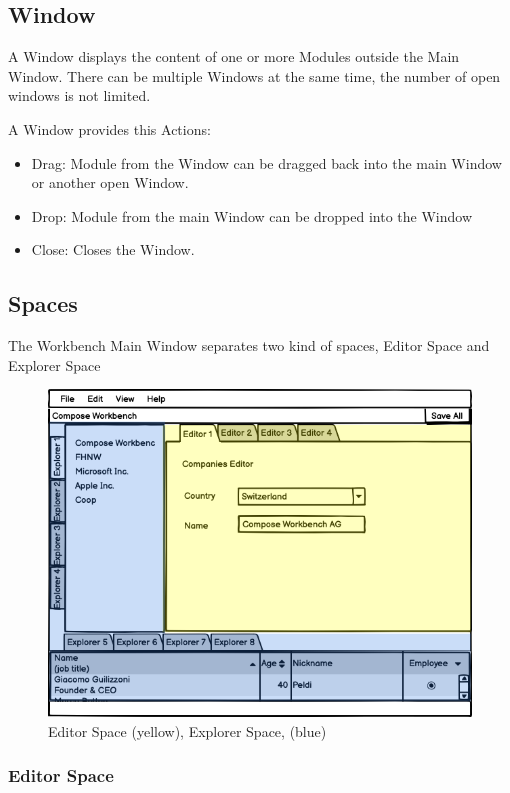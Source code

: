 \subsection{Window}
A Window displays the content of one or more Modules outside the Main Window. There can be multiple Windows at the same time, the number of open windows is not limited.


A Window provides this Actions:
\begin{itemize}
    \item Drag: Module from the Window can be dragged back into the main Window or another open Window.
    \item Drop: Module from the main Window can be dropped into the Window
    \item Close: Closes the Window.
\end{itemize}

\subsection{Spaces}
The Workbench Main Window separates two kind of spaces, Editor Space and Explorer Space
\begin{figure}[H]
    \includegraphics[width=1\linewidth]{images/WorkbenchCompose (SpacesColored) (SpacesColored).png}
    \caption{Editor Space (yellow), Explorer Space, (blue)}
\end{figure}

\subsubsection{Editor Space}


